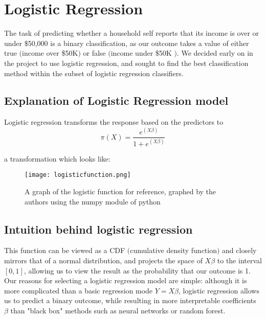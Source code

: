\documentclass[11pt]{article}
\begin{document}
\section{ Logistic Regression}
The task of predicting whether a household self reports that its income is over or under \$50,000 is a binary classification, as our outcome takes a value of either true $($income over \$50K$)$ or false $($income under \$50K $)$.  We decided early on in the project to use logistic regression, and sought to find the best classification method within the subset of logistic regression classifiers. 

\subsection{Explanation of Logistic Regression model}
Logistic regression transforms the response based on the predictors to
\begin{equation}
\pi(X) = \frac{e^{(X\beta)}}{1+e^{(X\beta)}}
\end{equation}

a transformation which looks like:
\begin{figure}[H]	
\centering
\texttt{[image: logisticfunction.png]}
\caption{A graph of the logistic function for reference, graphed by the authors using the numpy module of python}
\end{figure}

\subsection{Intuition behind logistic regression}
This function can be viewed as a CDF $($cumulative density function$)$ and closely mirrors that of a normal distribution, and projects the space of $X \beta$ to the interval $[0,1]$, allowing us to view the result as the probability that our outcome is 1. Our reasons for selecting a logistic regression model are simple: although it is more complicated than a basic regression mode $Y = X\beta$, logistic regression allows us to predict a binary outcome, while resulting in more interpretable coefficients $\beta$ than "black box" methods such as neural networks or random forest. 
\end{document}
